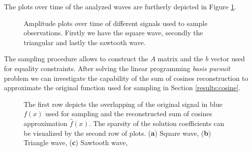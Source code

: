 \documentclass[journal,article,submit,electronics,pdftex]{Definitions/mdpi}
\begin{document}
The plots over time of the analyzed waves are furtherly depicted in Figure \ref{fig:waves}. 

\begin{figure}[H]
\centering
{}
\caption{Amplitude plots over time of different signals used to sample observations. Firstly we have the square wave, secondly the triangular and lastly the sawtooth wave.}
\label{fig:waves}
\end{figure}

The sampling procedure allows to construct the $A$ matrix and the $b$ vector used for equality constraints. After solving the linear programming \textit{basis pursuit} problem we can investigate the capability of the sum of cosines reconstruction to approximate the original function used for sampling in Section \ref{results:cosine}.

\begin{figure}[H]
\centering
\hspace*{\fill}
%
\hspace*{\fill}
%
\hfill{
}
\hspace*{\fill}
\caption{The first row depicts the overlapping of the original signal in blue $f(x)$ used for sampling and the reconstructed sum of cosines approximation $\hat{f}(x)$. The sparsity of the solution coefficients can be visualized by the second row of plots. (\textbf{a}) Square wave, (\textbf{b}) Triangle wave, (\textbf{c}) Sawtooth wave, }
\label{fig:fitting}
\end{figure}
\end{document}

